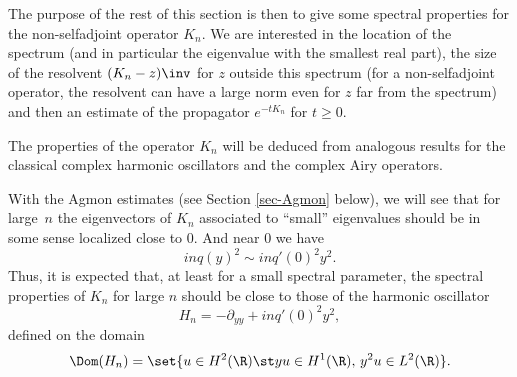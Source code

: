 The purpose of the rest of this section is then to give some spectral properties for the non-selfadjoint operator $K_n$. We are interested in the location of the spectrum (and in particular the eigenvalue with the smallest real part), the size of the resolvent $(K_n-z)\inv$ for $z$ outside this spectrum (for a non-selfadjoint operator, the resolvent can have a large norm even for $z$ far from the spectrum) and then an estimate of the propagator $e^{-t K_n}$ for $t \geq 0$.

The properties of the operator $K_n$ will be deduced from analogous results for the classical complex harmonic oscillators and the complex Airy operators.

With the Agmon estimates (see Section \ref{sec-Agmon} below), we will see that for large~$n$ the eigenvectors of $K_n$ associated to ``small'' eigenvalues should be in some sense localized close to 0. And near 0 we have
\[
in q(y)^2 \sim i n q'(0)^2 y^2.
\]
Thus, it is expected that, at least for a small spectral parameter, the spectral properties of $K_n$ for large $n$ should be close to those of the harmonic oscillator
\begin{equation} \label{def-Hn}
H_n = -\partial_{yy} + i n q'(0)^2 y^2,
\end{equation}
defined on the domain
\[
\Dom(H_n) = \set{ u \in H^2(\R) \st yu \in H^1(\R),\, y^2 u \in L^2(\R)}.
\]

